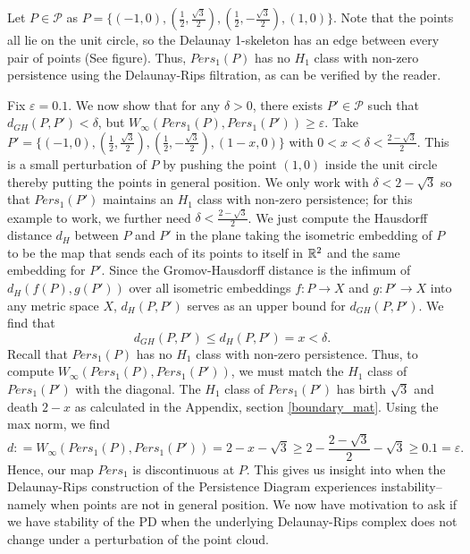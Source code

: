 \documentclass[letterpaper,titlepage]{article}
\begin{document}
Let $P \in \mathcal{P}$ as $P = \{(-1,0),(\frac{1}{2},\frac{\sqrt{3}}{2}),(\frac{1}{2},-\frac{\sqrt{3}}{2}),(1,0)\}.$ Note that the points all lie on the unit circle, so the Delaunay 1-skeleton has an edge between every pair of points (See figure). Thus, $Pers_1(P)$ has no $H_1$ class with non-zero persistence using the Delaunay-Rips filtration, as can be verified by the reader.

Fix $\varepsilon=0.1$. We now show that for any $\delta > 0$, there exists $P' \in \mathcal{P}$ such that $d_{GH}(P,P')< \delta$, but $W_\infty(Pers_1(P), Pers_1(P')) \geq \varepsilon.$ Take $P' = \{(-1,0),(\frac{1}{2},\frac{\sqrt{3}}{2}),(\frac{1}{2},-\frac{\sqrt{3}}{2}),(1-x,0)\}$ with $0<x < \delta < \frac{2-\sqrt{3}}{2}$. This is a small perturbation of $P$ by pushing the point $(1,0)$ inside the unit circle thereby putting the points in general position. We only work with $\delta<2-\sqrt{3}$ so that $Pers_1(P')$ maintains an $H_1$ class with non-zero persistence; for this example to work, we further need $\delta < \frac{2-\sqrt{3}}{2}$. We just compute the Hausdorff distance $d_H$ between $P$ and $P'$ in the plane taking the isometric embedding of $P$ to be the map that sends each of its points to itself in $\mathbb{R}^2$ and the same embedding for $P'$. Since the Gromov-Hausdorff distance is the infimum of $d_H(f(P),g(P'))$ over all isometric embeddings $f:P \to X$ and $g: P' \to X$ into any metric space $X$, $d_H(P,P')$ serves as an upper bound for $d_{GH}(P,P').$ We find that
$$d_{GH}(P,P')\leq d_H(P,P')=x<\delta.$$
Recall that $Pers_1(P)$ has no $H_1$ class with non-zero persistence. Thus, to compute $W_\infty(Pers_1(P),Pers_1(P'))$, we must match the $H_1$ class of $Pers_1(P')$ with the diagonal. The $H_1$ class of $Pers_1(P')$ has birth $\sqrt{3}$ and death $2-x$ as calculated in the Appendix, section \ref{boundary_mat}. Using the max norm, we find
$$d: = W_\infty(Pers_1(P),Pers_1(P')) = 2-x-\sqrt{3} \geq 2-\frac{2-\sqrt{3}}{2} -\sqrt{3} \geq 0.1 = \varepsilon.$$
Hence, our map $Pers_1$ is discontinuous at $P$. This gives us insight into when the Delaunay-Rips construction of the Persistence Diagram experiences instability--namely when points are not in general position. We now have motivation to ask if we have stability of the PD when the underlying Delaunay-Rips complex does not change under a perturbation of the point cloud.
\end{document}

